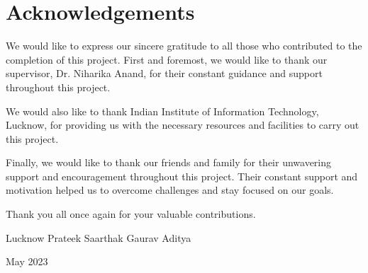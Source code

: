 \chapter*{Acknowledgements}

We would like to express our sincere gratitude to all those who contributed
to the completion of this project. First and foremost, we would like to
thank our supervisor, Dr. Niharika Anand, for their constant guidance
and support throughout this project.

We would also like to thank Indian Institute of Information Technology, Lucknow, for providing us with the necessary resources and facilities to carry out this project.

Finally, we would like to thank our friends and family for their unwavering support and encouragement throughout this project. Their constant support and motivation helped us to overcome challenges and stay focused on our goals.

Thank you all once again for your valuable contributions.

\vspace{3cm}

\noindent Lucknow \hfill Prateek
\noindent \hfill Saarthak
\noindent \hfill Gaurav
\noindent \hfill Aditya

\noindent May 2023